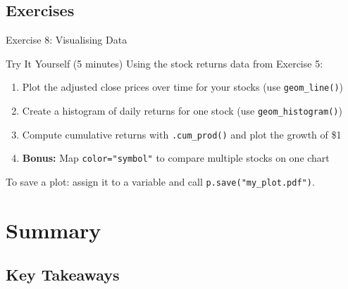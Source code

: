\documentclass[9pt,aspectratio=169]{beamer}
\newcommand{\py}[1]{\lstinline[language=Python]{#1}}
\begin{document}
\subsection{Exercises}
\begin{frame}[fragile]{Exercise 8: Visualising Data}

\begin{alertblock}{Try It Yourself (5 minutes)}
Using the stock returns data from Exercise 5:
\begin{enumerate}
    \item Plot the adjusted close prices over time for your stocks (use \texttt{geom\_line()})
    \item Create a histogram of daily returns for one stock (use \texttt{geom\_histogram()})
    \item Compute cumulative returns with \py{.cum_prod()} and plot the growth of \$1
    \item \textbf{Bonus:} Map \texttt{color="symbol"} to compare multiple stocks on one chart
\end{enumerate}
\end{alertblock}

\medskip

\begin{highlightbox}
\centering
To save a plot: assign it to a variable and call \texttt{p.save("my\_plot.pdf")}.
\end{highlightbox}

\end{frame}


\section{Summary}
\subsection{Key Takeaways}
\end{document}
